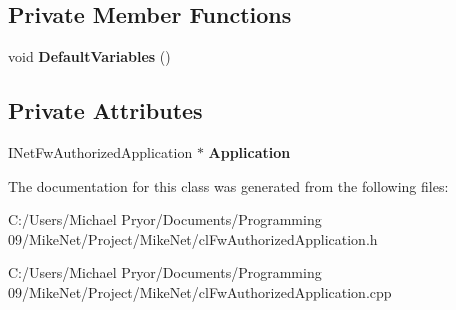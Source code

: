 \subsection*{Private Member Functions}
\begin{DoxyCompactItemize}
\item 
\hypertarget{classcl_fw_authorized_application_aedebd5c401ac8f76761ef18f91f5fd57}{
void {\bfseries DefaultVariables} ()}
\label{classcl_fw_authorized_application_aedebd5c401ac8f76761ef18f91f5fd57}

\end{DoxyCompactItemize}
\subsection*{Private Attributes}
\begin{DoxyCompactItemize}
\item 
\hypertarget{classcl_fw_authorized_application_a85f90915e25cee44d14051d396cca812}{
INetFwAuthorizedApplication $\ast$ {\bfseries Application}}
\label{classcl_fw_authorized_application_a85f90915e25cee44d14051d396cca812}

\end{DoxyCompactItemize}


The documentation for this class was generated from the following files:\begin{DoxyCompactItemize}
\item 
C:/Users/Michael Pryor/Documents/Programming 09/MikeNet/Project/MikeNet/clFwAuthorizedApplication.h\item 
C:/Users/Michael Pryor/Documents/Programming 09/MikeNet/Project/MikeNet/clFwAuthorizedApplication.cpp\end{DoxyCompactItemize}
